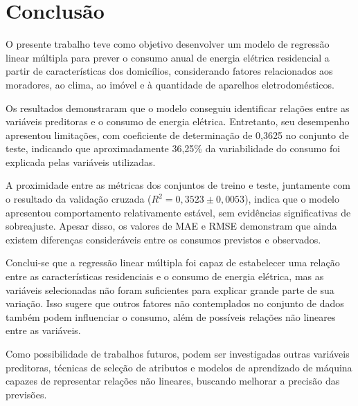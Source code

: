 
\chapter{Conclusão}

O presente trabalho teve como objetivo desenvolver um modelo de regressão linear múltipla para prever o consumo anual de energia elétrica residencial a partir de características dos domicílios, considerando fatores relacionados aos moradores, ao clima, ao imóvel e à quantidade de aparelhos eletrodomésticos.

Os resultados demonstraram que o modelo conseguiu identificar relações entre as variáveis preditoras e o consumo de energia elétrica. Entretanto, seu desempenho apresentou limitações, com coeficiente de determinação de 0,3625 no conjunto de teste, indicando que aproximadamente 36,25\% da variabilidade do consumo foi explicada pelas variáveis utilizadas.

A proximidade entre as métricas dos conjuntos de treino e teste, juntamente com o resultado da validação cruzada ($R^2 = 0,3523 \pm 0,0053$), indica que o modelo apresentou comportamento relativamente estável, sem evidências significativas de sobreajuste. Apesar disso, os valores de MAE e RMSE demonstram que ainda existem diferenças consideráveis entre os consumos previstos e observados.

Conclui-se que a regressão linear múltipla foi capaz de estabelecer uma relação entre as características residenciais e o consumo de energia elétrica, mas as variáveis selecionadas não foram suficientes para explicar grande parte de sua variação. Isso sugere que outros fatores não contemplados no conjunto de dados também podem influenciar o consumo, além de possíveis relações não lineares entre as variáveis.

Como possibilidade de trabalhos futuros, podem ser investigadas outras variáveis preditoras, técnicas de seleção de atributos e modelos de aprendizado de máquina capazes de representar relações não lineares, buscando melhorar a precisão das previsões.
